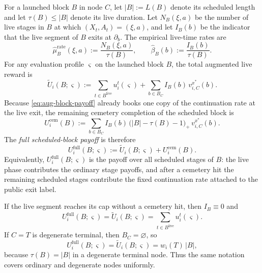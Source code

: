 \documentclass[12pt]{article}
\theoremstyle{definition}
\newcommand{\1}{\mathbf{1}}
\begin{document}
For a launched block $B$ in node $C$, let $|B|:=L(B)$ denote its scheduled
length and let $\tau(B)\le |B|$ denote its live duration. Let $N_B(\xi,a)$ be the
number of live stages in $B$ at which $(X_t,A_t)=(\xi,a)$, and let $I_B(b)$ be the
indicator that the live segment of $B$ exits at $\partial_b$. The empirical
live-time rates are
\[
\widehat\mu_B^{\mathrm{rate}}(\xi,a):=\frac{N_B(\xi,a)}{\tau(B)},
\qquad
\widehat\beta_B(b):=\frac{I_B(b)}{\tau(B)}.
\]
For any evaluation profile $\varsigma$ on the launched block $B$, the total
augmented live reward is
\begin{equation}
\label{eq:aug-block-payoff}
\widetilde U_i(B;\varsigma)
:=
\sum_{t\in B^{\mathrm{live}}} u_i^t(\varsigma)
+
\sum_{b\in B_C}I_B(b)\,v_{i,C}^{x^*}(b).
\end{equation}
Because \eqref{eq:aug-block-payoff} already books one copy of the continuation
rate at the live exit, the remaining cemetery completion of the scheduled block
is
\begin{equation}
\label{eq:block-cemetery-payoff}
U_i^{\mathrm{cem}}(B)
:=
\sum_{b\in B_C}I_B(b)\,\bigl(|B|-\tau(B)-1\bigr)_+\,v_{i,C}^{x^*}(b).
\end{equation}
The \emph{full scheduled-block payoff} is therefore
\begin{equation}
\label{eq:block-full-payoff}
U_i^{\mathrm{full}}(B;\varsigma)
:=
\widetilde U_i(B;\varsigma)+U_i^{\mathrm{cem}}(B).
\end{equation}
Equivalently, $U_i^{\mathrm{full}}(B;\varsigma)$ is the payoff over all scheduled
stages of $B$: the live phase contributes the ordinary stage payoffs, and after a
cemetery hit the remaining scheduled stages contribute the fixed continuation rate
attached to the public exit label.

If the live segment reaches its cap without a cemetery hit, then $I_B\equiv 0$ and
\[
U_i^{\mathrm{full}}(B;\varsigma)
=
\widetilde U_i(B;\varsigma)
=
\sum_{t\in B^{\mathrm{live}}}u_i^t(\varsigma).
\]
If $C=T$ is degenerate terminal, then $B_C=\varnothing$, so
\[
U_i^{\mathrm{full}}(B;\varsigma)
=
\widetilde U_i(B;\varsigma)
=
w_i(T)\,|B|,
\]
because $\tau(B)=|B|$ in a degenerate terminal node. Thus the same notation
covers ordinary and degenerate nodes uniformly.
\end{document}
